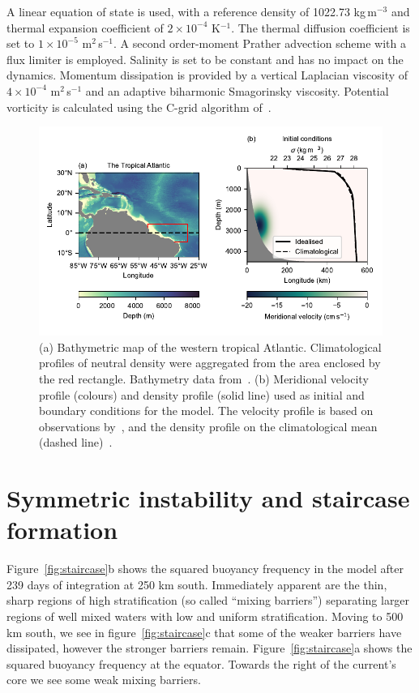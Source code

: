 A linear equation of state is used, with a reference density of 1022.73 kg\,m$^{-3}$ and thermal expansion coefficient of $2 \times 10^{-4}$ K$^{-1}$. The thermal diffusion coefficient is set to $1 \times 10^{-5}$ m$^{2}$\,s$^{-1}$. A second order-moment Prather advection scheme with a flux limiter is employed. Salinity is set to be constant and has no impact on the dynamics. Momentum dissipation is provided by a vertical Laplacian viscosity of $4 \times 10^{-4}$ m$^{2}$\,s$^{-1}$ and an adaptive biharmonic Smagorinsky viscosity. Potential vorticity is calculated using the C-grid algorithm of~\citet{Morel2019}.

\begin{figure}[h]
    \centering
    \includegraphics[width=\textwidth]{../figures/Figure1.pdf}
    \caption{(a) Bathymetric map of the western tropical Atlantic. Climatological profiles of neutral density were aggregated from the area enclosed by the red rectangle. Bathymetry data from~\citet{GEBCO2020}. (b) Meridional velocity profile (colours) and density profile (solid line) used as initial and boundary conditions for the model. The velocity profile is based on observations by~\citet{Schott2005}, and the density profile on the climatological mean (dashed line)~\citep{WOA2018}.}
    \label{fig:fig1}
\end{figure}

\section{Symmetric instability and staircase formation}
\label{sec:randd}
Figure~\ref{fig:staircase}b shows the squared buoyancy frequency in the model after 239 days of integration at 250 km south. Immediately apparent are the thin, sharp regions of high stratification (so called ``mixing barriers'') separating larger regions of well mixed waters with low and uniform stratification. Moving to 500 km south, we see in figure~\ref{fig:staircase}c that some of the weaker barriers have dissipated, however the stronger barriers remain. Figure~\ref{fig:staircase}a shows the squared buoyancy frequency at the equator. Towards the right of the current's core we  see some weak mixing barriers.

